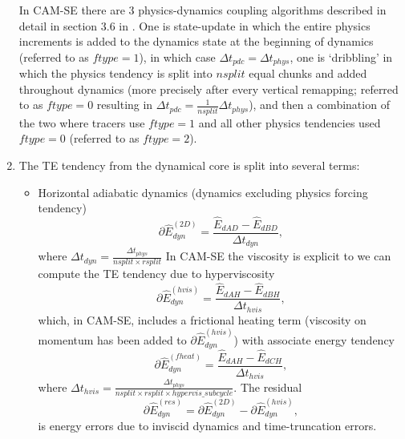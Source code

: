 \documentclass{agujournal}
\newcommand*{\gi}[1]{\widehat{#1}}
\begin{document}
\begin{enumerate}
In CAM-SE there are 3 physics-dynamics coupling algorithms described in detail in section 3.6 in \citet{LetAl2018JAMES}. One is state-update in which the entire physics increments is added to the dynamics state at the beginning of dynamics (referred to as $ftype=1$), in which case $\Delta t_{pdc}=\Delta t_{phys}$, one is `dribbling' in which the physics tendency is split into $nsplit$ equal chunks and added throughout dynamics (more precisely after every vertical remapping; referred to as $ftype=0$ resulting in $\Delta t_{pdc}=\frac{1}{nsplit}\Delta t_{phys}$), and then a combination of the two where tracers use  $ftype=1$ and all other physics tendencies used  $ftype=0$ (referred to as $ftype=2$). 
\item The TE tendency from the dynamical core is split into several terms:
\begin{itemize} 
\item Horizontal adiabatic dynamics (dynamics excluding physics forcing tendency)
\begin{equation}
\partial \gi{E}_{dyn}^{({2D})}=\frac{\gi{E}_{dAD}-\gi{E}_{dBD}}{\Delta t_{dyn}},
\end{equation}
where $\Delta t_{dyn}=\frac{\Delta t_{phys}}{nsplit\times rsplit}$
In CAM-SE the viscosity is explicit to we can compute the TE tendency due to hyperviscosity
\begin{equation}
\partial \gi{E}_{dyn}^{({hvis})}=\frac{\gi{E}_{dAH}-\gi{E}_{dBH}}{\Delta t_{hvis}},
\end{equation}
which, in CAM-SE, includes a frictional heating term (viscosity on momentum has been added to $\partial \gi{E}^{({hvis})}_{dyn}$) with associate energy tendency
\begin{equation}
\partial \gi{E}_{dyn}^{({fheat})}=\frac{\gi{E}_{dAH}-\gi{E}_{dCH}}{\Delta t_{hvis}},
\end{equation}
where $\Delta t_{hvis}=\frac{\Delta t_{phys}}{nsplit\times rsplit \times hypervis\_subcycle}$. The residual
\begin{equation}
\partial \gi{E}_{dyn}^{(res)}=\partial \gi{E}_{dyn}^{({2D})}-\partial \gi{E}_{dyn}^{({hvis})},
\end{equation}
is energy errors due to inviscid dynamics and time-truncation errors.


\end{itemize}
\end{enumerate}
\end{document}

